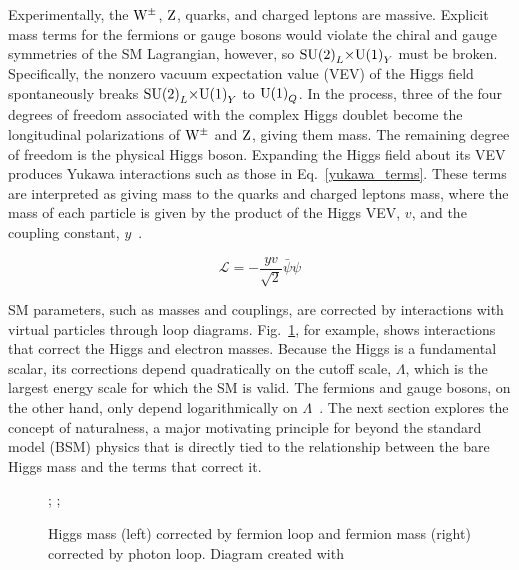 \documentclass[12pt]{article}
\begin{document}
    Experimentally, the $\mathrm{W}^\pm$, $\mathrm{Z}$, quarks, and charged leptons are massive. Explicit mass terms for the fermions or gauge bosons would violate the chiral and gauge symmetries of the SM Lagrangian, however, so $\mathrm{SU} {{\left(2\right)}}_L {\times} \mathrm{U} {\left(1\right)}_Y$ must be broken. Specifically, the nonzero vacuum expectation value (VEV) of the Higgs field spontaneously breaks $\mathrm{SU} {{\left(2\right)}}_L {\times} \mathrm{U} {\left(1\right)}_Y$ to $\mathrm{U} {\left(1\right)}_Q$. In the process, three of the four degrees of freedom associated with the complex Higgs doublet become the longitudinal polarizations of $\mathrm{W}^\pm$ and $\mathrm{Z}$, giving them mass. The remaining degree of freedom is the physical Higgs boson. Expanding the Higgs field about its VEV produces Yukawa interactions such as those in Eq.~\ref{yukawa_terms}. These terms are interpreted as giving mass to the quarks and charged leptons mass, where the mass of each particle is given by the product of the Higgs VEV, $v$, and the coupling constant, $y$~\cite{sm_intro}.

    \noindent \begin{equation}
        \mathcal{L} = -\frac{yv}{\sqrt{2}}\bar{\psi}\psi 
        \label{yukawa_terms}
    \end{equation}

    SM parameters, such as masses and couplings, are corrected by interactions with virtual particles through loop diagrams. Fig.~\ref{loop_diagrams}, for example, shows interactions that correct the Higgs and electron masses. Because the Higgs is a fundamental scalar, its corrections depend quadratically on the cutoff scale, $\Lambda$, which is the largest energy scale for which the SM is valid. The fermions and gauge bosons, on the other hand, only depend logarithmically on $\Lambda$~\cite{dine_naturalness}. The next section explores the concept of naturalness, a major motivating principle for beyond the standard model (BSM) physics that is directly tied to the relationship between the bare Higgs mass and the terms that correct it.


    \noindent \begin{figure}[htbp] \begin{center}
        ;
        \qquad
        ;
        \caption{Higgs mass (left) corrected by fermion loop and fermion mass (right) corrected by photon loop. Diagram created with~\cite{tikz}}
        \label{loop_diagrams}
    \end{center} \end{figure}
\end{document}
